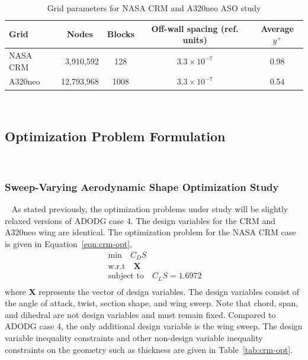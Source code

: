 \begin{table}[!tp]
\centering
\caption{Grid parameters for NASA CRM and A320neo ASO study}
\label{tab:grid-params}
\begin{tabular}{lrccc}
\hline\hline
Grid & \multicolumn{1}{c}{Nodes} & \multicolumn{1}{c}{Blocks} & \multicolumn{1}{c}{Off-wall spacing (ref. units)} & \multicolumn{1}{c}{Average $y^+$} \\ \hline
NASA CRM & 3,910,592 & 128 & $3.3\times10^{-7}$ & 0.98 \\
A320neo & 12,793,968 & 1008 & $3.3\times10^{-7}$ & 0.54 \\ \hline\hline
\end{tabular}
\end{table}
~\subsection{Optimization Problem Formulation}
~\label{ssec:opt-prob-formulate}
\vspace{-1.25cm}
~\subsubsection{Sweep-Varying Aerodynamic Shape Optimization Study}
~\label{sssec:aso-sweep-opt-methods}
As stated previously, the optimization problems under study will be slightly relaxed versions of ADODG case 4. The design variables for the CRM and A320neo wing are identical. The optimization problem for the NASA CRM case is given in Equation~\ref{eqn:crm-opt},
\begin{equation}
~\label{eqn:crm-opt}
    \begin{split}
        {\text{min}}\quad C_D S\\
        \text{w.r.t}\quad \mathbf{X}\\
        \text{subject to}\quad C_LS=1.6972\\
    \end{split}
\end{equation}
where $\mathbf{X}$ represents the vector of design variables. The design variables consist of the angle of attack, twist, section shape, and wing sweep. Note that chord, span, and dihedral are not design variables and must remain fixed. Compared to ADODG case 4, the only additional design variable is the wing sweep. The design variable inequality constraints and other non-design variable inequality constraints on the geometry such as thickness are given in Table~\ref{tab:crm-opt}.
